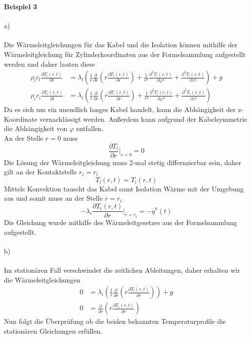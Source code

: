 \textbf{Beispiel 3}\\ \\
a)\\ \\
Die Wärmeleitgleichungen für das Kabel und die Isolation können mithilfe der Wärmeleitgleichung für Zylinderkoordinaten aus der Formelsammlung aufgestellt werden und daher lauten diese
\begin{align*}
	\rho_l c_l \frac{\partial T_l(r,t)}{\partial t} &= \lambda_l \left(\frac{1}{r}\frac{\partial }{\partial r}\left( r\frac{\partial T_l(r,t)}{\partial r}\right) + \frac{1}{r^2}\frac{\partial^2T_l(r,t)}{\partial \varphi^2} + \frac{\partial^2 T_l(r,t)}{\partial z^2}\right) + g \\
	\rho_i c_i \frac{\partial T_i(r,t)}{\partial t} &= \lambda_i \left(\frac{1}{r}\frac{\partial }{\partial r}\left( r\frac{\partial T_i(r,t)}{\partial r}\right) + \frac{1}{r^2}\frac{\partial^2T_i(r,t)}{\partial \varphi^2} + \frac{\partial^2 T_i(r,t)}{\partial z^2}\right)
\end{align*}
Da es sich um ein unendlich langes Kabel handelt, kann die Abhängigkeit der z-Koordinate vernachlässigt werden. Außerdem kann aufgrund der Kabelsymmetrie die Abhängigkeit von $\varphi$ entfallen. \\
An der Stelle $r = 0$ muss
\[
	\frac{\partial T_l}{\partial r}\biggl|_{r=0} = 0
\]
Die Lösung der Wärmeleitgleichung muss 2-mal stetig differnzierbar sein, daher gilt an der Kontaktstelle $r_i = r_l$
\[
	T_l(r,t) = T_i(r,t)
\]
Mittels Konvektion tauscht das Kabel samt Isolation Wärme mit der Umgebung aus und somit muss an der Stelle $r = r_i$
\[
	-\lambda_i\frac{\partial T_i(r,t)}{\partial r}\biggl|_{r = r_i} = -\dot{q}^a(t)
\]
Die Gleichung wurde mithilfe des Wärmeleitgesetzes aus der Formelsammlung aufgestellt. \\ \\
b)\\ \\
Im stationären Fall verschwindet die zeitlichen Ableitungen, daher erhalten wir die Wärmeleitgleichungen
\begin{align*}
	0 &= \lambda_i\left( \frac{1}{r}\frac{\partial }{\partial r}\left( r\frac{\partial T_l(r,t)}{\partial r}\right)\right) + g \\
	0 &= \frac{\partial }{\partial r}\left( r\frac{\partial T_i(r,t)}{\partial r}\right)
\end{align*}
\newpage
\noindent
Nun folgt die Überprüfung ob die beiden bekannten Temperaturprofile die stationären Gleichungen erfüllen.\\
